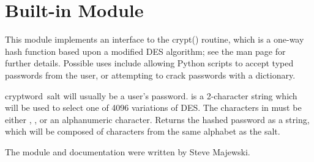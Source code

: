 \section{Built-in Module }
\label{module-crypt}

This module implements an interface to the crypt() routine,
which is a one-way hash function based upon a modified DES algorithm;
see the \UNIX{} man page for further details.  Possible uses include
allowing Python scripts to accept typed passwords from the user, or
attempting to crack \UNIX{} passwords with a dictionary.

\renewcommand{\indexsubitem}{(in module crypt)}
\begin{funcdesc}{crypt}{word\, salt} 
 will usually be a user's password.   is a
2-character string which will be used to select one of 4096 variations
of DES.  The characters in  must be either ,
\code{/}, or an alphanumeric character.  Returns the hashed password
as a string, which will be composed of characters from the same
alphabet as the salt.
\end{funcdesc}

The module and documentation were written by Steve Majewski.
